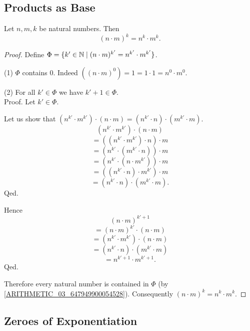 \documentclass[10pt]{article}
\begin{document}
  \subsection{Products as Base}

  \begin{forthel}
    \begin{proposition}
      Let $n, m, k$ be natural numbers.
      Then \[ (n \cdot m)^{k} = n^{k} \cdot m^{k}. \]
    \end{proposition}
    \begin{proof}
      Define $\Phi = \{ k' \in \mathbb{N} \mid (n \cdot m)^{k'} =
      n^{k'} \cdot m^{k'} \}$.

      (1) $\Phi$ contains $0$.
      Indeed $((n \cdot m)^{0})
        = 1
        = 1 \cdot 1
        = n^{0} \cdot m^{0}$. %

      (2) For all $k' \in \Phi$ we have $k' + 1 \in \Phi$. \\
      Proof.
        Let $k' \in \Phi$.

        Let us show that $(n^{k'} \cdot m^{k'}) \cdot (n \cdot m) =
        (n^{k'} \cdot n) \cdot (m^{k'} \cdot m)$.
          \[  (n^{k'} \cdot m^{k'}) \cdot (n \cdot m)       \]
          \[    = ((n^{k'} \cdot m^{k'}) \cdot n) \cdot m   \]
          \[    = (n^{k'} \cdot (m^{k'} \cdot n)) \cdot m   \]
          \[    = (n^{k'} \cdot (n \cdot m^{k'})) \cdot m   \]
          \[    = ((n^{k'} \cdot n) \cdot m^{k'}) \cdot m   \]
          \[    = (n^{k'} \cdot n) \cdot (m^{k'} \cdot m).  \]
        Qed.

        Hence
        \[  (n \cdot m)^{k' + 1}                          \]
        \[    = (n \cdot m)^{k'} \cdot (n \cdot m)        \]
        \[    = (n^{k'} \cdot m^{k'}) \cdot (n \cdot m)   \]
        \[    = (n^{k'} \cdot n) \cdot (m^{k'} \cdot m)   \]
        \[    = n^{k' + 1} \cdot m^{k' + 1}.              \]
      Qed.

      Therefore every natural number is contained in $\Phi$ (by \cref{ARITHMETIC_03_647949900054528}).
      Consequently $(n \cdot m)^{k} = n^{k} \cdot m^{k}$.
    \end{proof}
  \end{forthel}


  \subsection{Zeroes of Exponentiation}
\end{document}
